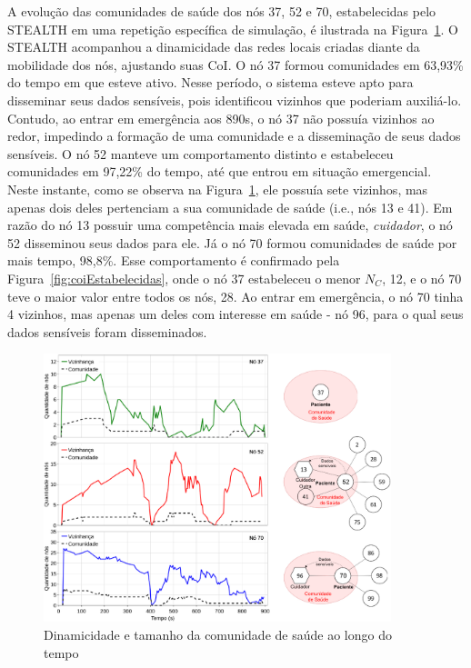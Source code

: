 \documentclass[12pt]{article}
\begin{document}
A
evolução
das comunidades de saúde dos nós 37, 52 e 70, estabelecidas pelo \mbox{STEALTH}
em uma repetição específica de simulação, é ilustrada na Figura~\ref{fig:neighs_x_cois}.
O \mbox{STEALTH} acompanhou 
a dinamicidade das redes locais criadas diante da mobilidade dos nós, ajustando suas CoI.
O nó 37 formou comunidades em 63,93\% do tempo em que esteve ativo. Nesse período, o sistema esteve apto para disseminar seus dados sensíveis, pois  identificou  vizinhos que poderiam auxiliá-lo. Contudo,
ao entrar em emergência aos 890s, o nó 37 não possuía vizinhos ao redor, impedindo a formação de uma comunidade e  a disseminação de seus dados sensíveis. O nó 52 manteve um comportamento distinto  e estabeleceu comunidades em 97,22\% do tempo, até que entrou em situação emergencial. Neste instante, como se observa na Figura~\ref{fig:neighs_x_cois}, ele possuía sete vizinhos, mas apenas dois deles pertenciam a sua comunidade de saúde (i.e., nós 13 e 41). 
Em razão do nó 13 possuir  uma competência mais elevada em saúde, \textit{cuidador}, o nó 52 disseminou seus dados para ele. Já  o nó 70  formou comunidades de saúde por mais tempo, 98,8\%. Esse comportamento é confirmado pela Figura~\ref{fig:coiEstabelecidas}, onde o nó 37 estabeleceu o menor $N_C$, 12, e o nó 70 teve o maior valor entre todos os nós, 28. Ao entrar em emergência, o nó 70 tinha 4 vizinhos, mas apenas um deles com interesse em saúde - nó 96, para o qual seus dados sensíveis foram disseminados. 

\begin{figure}[!htb]
\centering
\includegraphics[width=0.9\textwidth]{figures/neighs_cois_v2_890s_stack_3.pdf}
\vspace{-0.2cm}
\caption{Dinamicidade e tamanho da comunidade de saúde ao longo do tempo}
\label{fig:neighs_x_cois}
\end{figure}
\end{document}
